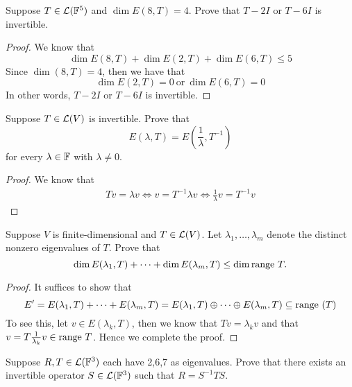 \documentclass{extarticle}
\begin{document}
\begin{problem}{6}
    Suppose \(T \in \mathcal{L}(\mathbb{F}^5)\) and \(\dim E(8, T) = 4\). Prove that \(T - 2 I\) or \(T - 6I\) is invertible. 
\end{problem}

\begin{proof}
We know that 
\[\dim E(8, T) + \dim E(2, T) + \dim E(6, T) \leq 5\]
Since \(\dim (8, T) = 4\), then we have that 
\[\dim E(2,T) = 0 \ \text{or} \ \dim E(6, T) = 0\]
In other words, \(T - 2I\) or \(T - 6I\) is invertible. 

\end{proof}


\begin{problem}{7}
    Suppose \(T \in \mathcal{L}(V)\) is invertible. Prove that 
    \[E(\lambda, T) = E(\frac{1}{\lambda}, T^{-1})\]
    for every \(\lambda \in \mathbb{F}\) with \(\lambda \neq 0\). 
\end{problem}

\begin{proof}
We know that 
\begin{align*}
    Tv = \lambda v \Leftrightarrow v = T^{-1} \lambda v  
    \Leftrightarrow \frac{1}{\lambda}v = T^{-1} v
\end{align*}
\end{proof}

\begin{problem}{8}
    Suppose \(V\) is finite-dimensional and \(T \in \mathcal{L}(V)\). Let \(\lambda_1, \ldots, \lambda_m\) denote 
    the distinct nonzero eigenvalues of \(T\). Prove that 
    \[\dim E(\lambda_1, T) + \cdots + \dim E(\lambda_m, T) \leq \dim \text{range } T.\]
\end{problem}

\begin{proof}
It suffices to show that 
\[E' = E(\lambda_1, T) + \cdots + E(\lambda_m, T) = E(\lambda_1, T) \oplus \cdots \oplus E(\lambda_m, T) 
\subseteq \text{range } (T)\]
To see this, let \(v \in E(\lambda_k, T)\), then we know that \(Tv = \lambda_k v\) and that 
\(v = T \frac{1}{\lambda_k}v  \in \text{range } T\). Hence we complete the proof. 
\end{proof}



\begin{problem}{9}
    Suppose \(R, T \in \mathcal{L}(\mathbb{F}^3)\) each have 2,6,7 as eigenvalues. Prove that there exists an invertible 
    operator \(S \in \mathcal{L}(\mathbb{F}^3)\) such that \(R = S^{-1}TS\).
\end{problem}
\end{document}
